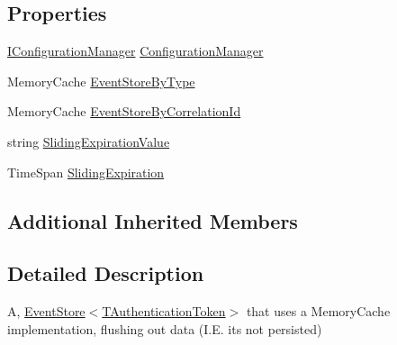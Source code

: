 \subsection*{Properties}
\begin{DoxyCompactItemize}
\item 
\hyperlink{interfaceCqrs_1_1Configuration_1_1IConfigurationManager}{I\+Configuration\+Manager} \hyperlink{classCqrs_1_1Events_1_1MemoryCacheEventStore_a8a4fc4fa5d767e4d15344daf1ba7ea01_a8a4fc4fa5d767e4d15344daf1ba7ea01}{Configuration\+Manager}
\item 
Memory\+Cache \hyperlink{classCqrs_1_1Events_1_1MemoryCacheEventStore_afc04a822655f1e23a1cce8ed1a40627f_afc04a822655f1e23a1cce8ed1a40627f}{Event\+Store\+By\+Type}
\item 
Memory\+Cache \hyperlink{classCqrs_1_1Events_1_1MemoryCacheEventStore_a6f317c9f46dfd65d7398b010f484b687_a6f317c9f46dfd65d7398b010f484b687}{Event\+Store\+By\+Correlation\+Id}
\item 
string \hyperlink{classCqrs_1_1Events_1_1MemoryCacheEventStore_af45012b233f4f4c8ef3c00bf8fba7a80_af45012b233f4f4c8ef3c00bf8fba7a80}{Sliding\+Expiration\+Value}
\item 
Time\+Span \hyperlink{classCqrs_1_1Events_1_1MemoryCacheEventStore_a93423872cdd702ee6257c0cc704c0c06_a93423872cdd702ee6257c0cc704c0c06}{Sliding\+Expiration}
\end{DoxyCompactItemize}
\subsection*{Additional Inherited Members}


\subsection{Detailed Description}
A, \hyperlink{classCqrs_1_1Events_1_1EventStore_a6346cb2aea4c5b4e740dc6cfb15abab8_a6346cb2aea4c5b4e740dc6cfb15abab8}{Event\+Store$<$\+T\+Authentication\+Token$>$} that uses a Memory\+Cache implementation, flushing out data (I.\+E. it\textquotesingle{}s not persisted) 




